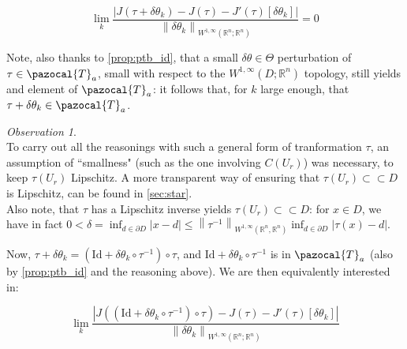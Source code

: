 \documentclass[english,a4paper,9pt,oneside]{scrbook}	%
\theoremstyle{break}
\theoremstyle{remark}
\newtheorem{obs}[equation]{Observation}
\newcommand{\mR}{\mathbb{R}}
\newcommand{\norm}[1]{\left\lVert#1\right\rVert}
\newcommand{\cc}{\subset\subset}
\newcommand{\cT}{\pazocal{T}}
\newcommand{\id}{\text{Id}}
\newcommand{\te}{\theta}
\newcommand{\Te}{\Theta}
\begin{document}
$$\lim_{k}\frac{|J(\tau+\delta \te_k)-J(\tau)-J'(\tau)[\delta \te_k]|}{\norm{\delta \te_k}_{W^{1,\infty}(\mR^n;\mR^n)}}=0$$


Note, also thanks to \cref{prop:ptb_id}, that a small $\delta \te \in \Te$ perturbation of $\tau \in \cT_a$, small with respect to the $W^{1,\infty}(D;\mR^n)$ topology, still yields and element of $\cT_a$: it follows that, for $k$ large enough, that $\tau+\delta \te_k \in \cT_a$.


\begin{obs}
\mbox{}\\
To carry out all the reasonings with such a general form of tranformation $\tau$, an assumption of ``smallness" (such as the one involving $C(U_r)$) was necessary, to keep $\tau(U_r)$ Lipschitz. A more transparent way of ensuring that $\tau(U_r)\cc D$ is Lipschitz, can be found in \cref{sec:star}.
\mbox{}\\
Also note, that $\tau$ has a Lipschitz inverse yields $\tau(U_r)\cc D$: for $x \in D$, we have in fact $0<\delta = \inf_{d \in \partial D}|x-d|\leq \norm{\tau^{-1}}_{W^{1,\infty}(\mR^n,\mR^n)}\inf_{d \in \partial D}|\tau(x)-d|$.
\end{obs}


Now, $\tau+\delta \te_k  = (\id+\delta\te_k \circ \tau^{-1})\circ \tau$, and $\id+\delta\te_k \circ \tau^{-1}$ is in $\cT_a$ (also by \cref{prop:ptb_id} and the reasoning above). We are then equivalently interested in:

$$\lim_{k}\frac{|J((\id+\delta\te_k \circ \tau^{-1})\circ \tau)-J(\tau)-J'(\tau)[\delta \te_k]|}{\norm{\delta \te_k}_{W^{1,\infty}(\mR^n;\mR^n)}}$$

\end{document}
